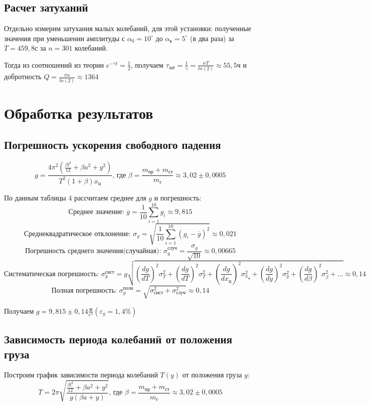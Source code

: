 \documentclass[a4paper]{article}
\begin{document}
\subsection{Расчет затуханий}
Отдельно измерим затухания малых колебаний, для этой установки: полученные значения при уменьшении амплитуды с $\alpha_{0} = 10^{\circ}$ до $\alpha_{\text{к}} = 5^{\circ}$ (в два раза) за $T = 459,8$с за $n = 301$ колебаний.

Тогда из соотношений из теории $e^{-\gamma t} = \frac{1}{2}$, получаем $\tau_{\text{зат}} = \frac{1}{\gamma} = \frac{nT}{ln(2)} \approx 55,5$ч и добротность $Q = \frac{\pi n}{ln(2)} \approx 1364$

\section{Обработка результатов}
\subsection{Погрешность ускорения свободного падения}
\[g = \frac{4\pi^2(\frac{\beta l^2}{12} + \beta a^2 + y^2)}{T^2 (1 + \beta) x_{\text{ц}}} \text{,  где $\beta = \frac{m_{\text{пр}} + m_{\text{ст}}}{m_{\text{г}}} \approx 3,02 \pm 0,0005$}\]

По данным таблицы 4 рассчитаем среднее для $g$ и погрешность:
\[\text{Среднее значение:  } \overline{g} = \frac{1}{10}\sum\limits_{i=1}^{10} g_{i} \approx 9,815\]
\[\text{Среднеквадратическое отклонение:  } \sigma_{g} = \sqrt{\frac{1}{10}\sum\limits_{i=1}^{10} (g_{i} - \overline{g})^2} \approx 0,021\]
\[\text{Погрешность среднего значения(случайная):  } \sigma_{g}^{\text{случ}} = \frac{\sigma_{g}}{\sqrt{10}} \approx 0,00665\]
\[\text{Систематическая погрешность:  }\sigma_{g}^{\text{сист}} = g\sqrt{\left( \frac{dg}{dT}\right)^2 \sigma_{T}^2 + \left(\frac{dg}{dT}\right)^2 \sigma_{T}^2 + \left(\frac{dg}{dx_{\text{ц}}}\right)^2 \sigma_{x_{\text{ц}}}^2 + \left(\frac{dg}{dy}\right)^2 \sigma_{y}^2 + \left(\frac{dg}{d\beta}\right)^2 \sigma_{\beta}^2 + ...} \approx 0,14\]
\[\text{Полная погрешность:  }\sigma_{g}^{\text{полн}} = \sqrt{\sigma_{\text{сист}}^2 + \sigma_{\text{случ}}^2} \approx 0,14\]

Получаем $g = 9,815 \pm 0,14 \frac{\text{м}}{\text{c}^2} (\varepsilon_{g} = 1,4\%)$
\subsection{Зависимость периода колебаний от положения груза}
Построим график зависимости периода колебаний $T(y)$ от положения груза $y$:
\[T = 2\pi \sqrt{\frac{\frac{\beta l^2}{12} + \beta a^2 + y^2}{g \left( \beta a + y \right)}} \text{,  где $\beta = \frac{m_{\text{пр}} + m_{\text{ст}}}{m_{\text{г}}} \approx 3,02 \pm 0,0005$}\]
\end{document}

